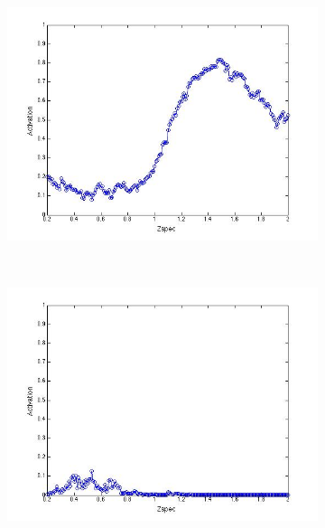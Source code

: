 \documentclass[useAMS,usenatbib,fleqn]{mn2e}
\begin{document}
\begin{figure}
\begin{subfigure}[b]{0.075\textwidth}
                \includegraphics[trim = 35px 15px 50px 25px, clip=true,width=\textwidth]{activation_05.jpg}
        \end{subfigure}
        ~
        \begin{subfigure}[b]{0.075\textwidth}
                \includegraphics[trim = 35px 15px 50px 25px, clip=true,width=\textwidth]{activation_06.jpg}
        \end{subfigure}
        ~
        \begin{subfigure}[b]{0.075\textwidth}

\end{subfigure}
\end{figure}
\end{document}
